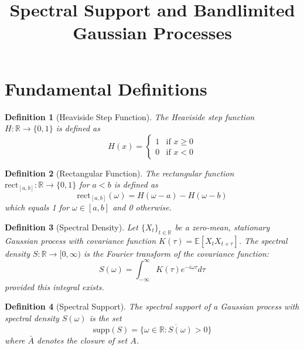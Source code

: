 \documentclass{article}
\newtheorem{definition}{Definition}
{\theorembodyfont{\rmfamily}\newtheorem{example}{Example}}
\begin{document}
\title{Spectral Support and Bandlimited Gaussian Processes}

\date{}

\maketitle

{\tableofcontents}

\section{Fundamental Definitions}

\begin{definition}
  [Heaviside Step Function] The Heaviside step function $H : \mathbb{R} \to
  \{0, 1\}$ is defined as
  \begin{equation}
    H (x) = \left\{\begin{array}{ll}
      1 & \text{if } x \geq 0\\
      0 & \text{if } x < 0
    \end{array}\right.
  \end{equation}
\end{definition}

\begin{definition}
  [Rectangular Function] The rectangular function $\mathrm{rect}_{[a, b]} :
  \mathbb{R} \to \{0, 1\}$ for $a < b$ is defined as
  \begin{equation}
    \mathrm{rect}_{[a, b]} (\omega) = H (\omega - a) - H (\omega - b)
  \end{equation}
  which equals 1 for $\omega \in [a, b]$ and 0 otherwise.
\end{definition}

\begin{definition}
  [Spectral Density] Let $\{X_t \}_{t \in \mathbb{R}}$ be a zero-mean,
  stationary Gaussian process with covariance function $K (\tau) =\mathbb{E}
  [X_t X_{t + \tau}]$. The spectral density $S : \mathbb{R} \to [0, \infty)$
  is the Fourier transform of the covariance function:
  \begin{equation}
    S (\omega) = \int_{- \infty}^{\infty} K (\tau) e^{- i \omega \tau} d \tau
  \end{equation}
  provided this integral exists.
\end{definition}

\begin{definition}
  [Spectral Support] The spectral support of a Gaussian process with spectral
  density $S (\omega)$ is the set
  \begin{equation}
    \mathrm{supp} (S) = \overline{\{\omega \in \mathbb{R}: S (\omega) > 0\}}
  \end{equation}
  where $\bar{A}$ denotes the closure of set $A$.
\end{definition}
\end{document}
